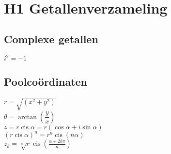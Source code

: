 \section{H1 Getallenverzameling}
\subsection{Complexe getallen}
$i^2=-1$\\

\subsection{Poolcoördinaten}
$r=\sqrt{(x^2+y^2)}$\\
$\theta=\arctan \left(\dfrac{y}{x}\right)$\\
$z=r\operatorname{cis}\alpha = r(\cos \alpha + i\sin \alpha)$\\
$(r\operatorname{cis}\alpha)^n=r^n\operatorname{cis}(n\alpha)$\\
$z_k=\sqrt[n]{r} \operatorname{cis} \left(\frac{\alpha + 2k\pi}{n} \right)$
